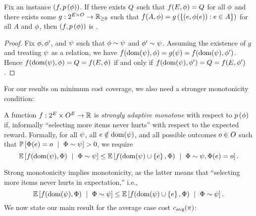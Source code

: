 \begin{proposition}
\label{prop:certifying}
Fix an instance $(f, {\color{black}{\ensuremath{p \left( {{\color{black}{\ensuremath{\phi}}}} \right) }}})$.
If there exists $Q$ such that $f(E, {\color{black}{\ensuremath{\phi}}}) = Q$ for
all ${\color{black}{\ensuremath{\phi}}}$ and there exists some $g:2^{E \times O} \to
\mathbb{R}_{\ge 0}$ such that $f(A, {\color{black}{\ensuremath{\phi}}}) = g \left( { \left\{(e,
    {\color{black}{\ensuremath{\phi}}}(e)) : e \in A\right\}} \right) $ for all $A$ and ${\color{black}{\ensuremath{\phi}}}$,
then $(f, {\color{black}{\ensuremath{p \left( {{\color{black}{\ensuremath{\phi}}}} \right) }}})$ is \certifying.
\end{proposition}

\begin{proof}
Fix ${\color{black}{\ensuremath{\phi}}}, {\color{black}{\ensuremath{\phi}}}'$, and ${\color{black}{\ensuremath{\psi}}}$ such that ${\color{black}{\ensuremath{\phi}}} \sim {\color{black}{\ensuremath{\psi}}}$ and ${\color{black}{\ensuremath{\phi}}}'
\sim {\color{black}{\ensuremath{\psi}}}$.  Assuming the existence of $g$ and treating ${\color{black}{\ensuremath{\psi}}}$ as a relation, we have 
$f(\operatorname{dom}({\color{black}{\ensuremath{\psi}}}), {\color{black}{\ensuremath{\phi}}}) = g({\color{black}{\ensuremath{\psi}}}) = f(\operatorname{dom}({\color{black}{\ensuremath{\psi}}}), {\color{black}{\ensuremath{\phi}}}')$.
Hence $f(\operatorname{dom}({\color{black}{\ensuremath{\psi}}}), {\color{black}{\ensuremath{\phi}}}) = Q = f(E, {\color{black}{\ensuremath{\phi}}})$ if and only if 
$f(\operatorname{dom}({\color{black}{\ensuremath{\psi}}}), {\color{black}{\ensuremath{\phi}}}') = Q = f(E, {\color{black}{\ensuremath{\phi}}}') $.
\end{proof}

%
\noindent
For our results on minimum cost coverage, we also need a stronger  monotonicity condition:

\begin{definition} \label{def:SSM}
A function $f:2^{E} \times O^{E} \to
\mathbb{R}$ is \emph{strongly adaptive monotone} with respect to
${\color{black}{\ensuremath{p \left( {{\color{black}{\ensuremath{\phi}}}} \right) }}}$ if, informally ``selecting more items never hurts'' with respect to the expected reward.
Formally, for all ${\color{black}{\ensuremath{\psi}}}$, all $e \notin \operatorname{dom}({\color{black}{\ensuremath{\psi}}})$, and all
possible outcomes $o \in O$ such that 
$\prob{\rvrlz(\elem) = \outcome \  \mid \ \rvrlz \sim \prlz  } > 0$,
we require 
\begin{equation} \label{eqn:strong-adapt-monotonicity}
\expctoverrlz{\rvrlz}{f(\dom(\prlz), \rvrlz) \ \mid \ \rvrlz \sim \prlz} \le 
\expctoverrlz{\rvrlz}{f(\dom(\prlz) \cup \set{\elem}, \rvrlz) \ \mid \ \rvrlz \sim
  \prlz, \rvrlz(\elem) = \outcome}\mbox{.}   
\end{equation}
\end{definition}
%

%
Strong \term monotonicity implies
\term monotonicity, as the latter means that ``selecting more items
never hurts in expectation,'' i.e., 
$$\expctoverrlz{\rvrlz}{f(\dom(\prlz), \rvrlz) \ \mid \ \rvrlz \sim \prlz} \le 
\expctoverrlz{\rvrlz}{f(\dom(\prlz) \cup \set{\elem}, \rvrlz) \ \mid \ \rvrlz \sim
  \prlz}.$$
We now state our main result for the  average case cost ${c_{\text{avg}}{(\pi)}}$:

